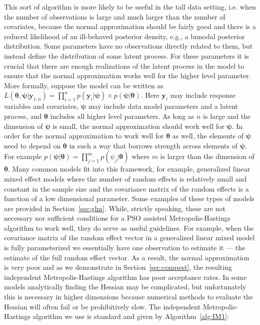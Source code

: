 \documentclass[12pt]{article}
\begin{document}
This sort of algorithm is more likely to be useful in the tall data setting, i.e. when the number of observations is large and much larger than the number of covariates, because the normal approximation should be fairly good and there is a reduced likelihood of an ill-behaved posterior density, e.g., a bimodal posterior distribution. Some parameters have no observations directly related to them, but instead define the distribution of some latent process. For these parameters it is crucial that there are enough realizations of the latent process in the model to ensure that the normal approximation works well for the higher level parameter. More formally, suppose the model can be written as $L(\bm{\theta},\bm{\psi}|\bm{y}_{1:n}) = \prod_{i=1}^np(\bm{y}_i|\bm{\psi}) \times p(\bm{\psi}|\bm{\theta})$. Here $\bm{y}_i$ may include response variables and covariates, $\bm{\psi}$ may include data model parameters and a latent process, and $\bm{\theta}$ includes all higher level parameters. As long as $n$ is large and the dimension of $\bm{\psi}$ is small, the normal approximation should work well for $\bm{\psi}$. In order for the normal approximation to work well for $\bm{\theta}$ as well, the elements of $\bm{\psi}$ need to depend on $\bm{\theta}$ in such a way that borrows strength across elements of $\bm{\psi}$. For example $p(\bm{\psi}|\bm{\theta}) = \prod_{j=1}^mp(\psi_j|\bm{\theta})$ where $m$ is larger than the dimension of $\bm{\theta}$. Many common models fit into this framework, for example, generalized linear mixed effect models where the number of random effects is relatively small and constant in the sample size and the covariance matrix of the random effects is a function of a low dimensional parameter. Some examples of these types of models are provided in Section~\ref{sec:glm}. While, strictly speaking, these are not necessary nor sufficient conditions for a PSO assisted Metropolis-Hastings algorithm to work well, they do serve as useful guidelines. For example, when the covariance matrix of the random effect vector in a generalized linear mixed model is fully parameterized we essentially have one observation to estimate it --- the estimate of the full random effect vector. As a result, the normal approximation is very poor and as we demonstrate in Section~\ref{sec:compest}, the resulting independent Metropolis-Hastings algorithm has poor acceptance rates. In some models analytically finding the Hessian may be complicated, but unfortunately this is necessary in higher dimensions because numerical methods to evaluate the Hessian will often fail or be prohibitively slow. The independent Metropolis-Hastings algorithm we use is standard and given by Algorithm~\ref{alg:IM1}:
\end{document}
